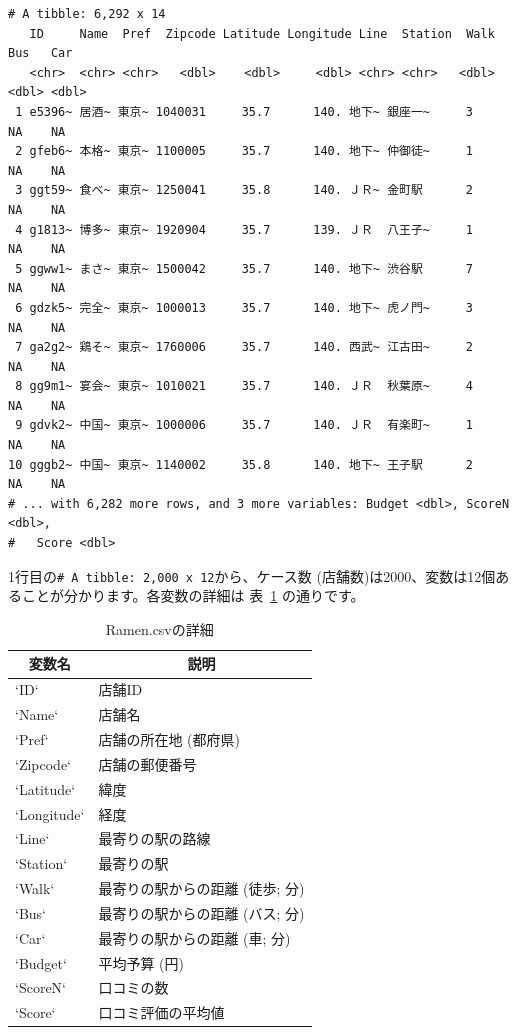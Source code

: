 \documentclass[
  a4paper,
  pandoc,
  ja=standard,
  jafont=haranoaji]{bxjsbook}
\begin{document}
\begin{verbatim}
# A tibble: 6,292 x 14
   ID     Name  Pref  Zipcode Latitude Longitude Line  Station  Walk   Bus   Car
   <chr>  <chr> <chr>   <dbl>    <dbl>     <dbl> <chr> <chr>   <dbl> <dbl> <dbl>
 1 e5396~ 居酒~ 東京~ 1040031     35.7      140. 地下~ 銀座一~     3    NA    NA
 2 gfeb6~ 本格~ 東京~ 1100005     35.7      140. 地下~ 仲御徒~     1    NA    NA
 3 ggt59~ 食べ~ 東京~ 1250041     35.8      140. ＪＲ~ 金町駅      2    NA    NA
 4 g1813~ 博多~ 東京~ 1920904     35.7      139. ＪＲ  八王子~     1    NA    NA
 5 ggww1~ まさ~ 東京~ 1500042     35.7      140. 地下~ 渋谷駅      7    NA    NA
 6 gdzk5~ 完全~ 東京~ 1000013     35.7      140. 地下~ 虎ノ門~     3    NA    NA
 7 ga2g2~ 鶏そ~ 東京~ 1760006     35.7      140. 西武~ 江古田~     2    NA    NA
 8 gg9m1~ 宴会~ 東京~ 1010021     35.7      140. ＪＲ  秋葉原~     4    NA    NA
 9 gdvk2~ 中国~ 東京~ 1000006     35.7      140. ＪＲ  有楽町~     1    NA    NA
10 gggb2~ 中国~ 東京~ 1140002     35.8      140. 地下~ 王子駅      2    NA    NA
# ... with 6,282 more rows, and 3 more variables: Budget <dbl>, ScoreN <dbl>,
#   Score <dbl>
\end{verbatim}

1行目の\texttt{\#\ A\ tibble:\ 2,000\ x\ 12}から、ケース数
(店舗数)は2000、変数は12個あることが分かります。各変数の詳細は
表~\ref{tbl-handling1_dataset} の通りです。

\hypertarget{tbl-handling1_dataset}{}
\begin{table}
\caption{\label{tbl-handling1_dataset}Ramen.csvの詳細 }

\centering
\begin{tabular}{l|l}
\hline
\multicolumn{1}{c}{変数名} & \multicolumn{1}{c}{説明}\\
\hline
`ID` & 店舗ID\\
\hline
`Name` & 店舗名\\
\hline
`Pref` & 店舗の所在地 (都府県)\\
\hline
`Zipcode` & 店舗の郵便番号\\
\hline
`Latitude` & 緯度\\
\hline
`Longitude` & 経度\\
\hline
`Line` & 最寄りの駅の路線\\
\hline
`Station` & 最寄りの駅\\
\hline
`Walk` & 最寄りの駅からの距離 (徒歩; 分)\\
\hline
`Bus` & 最寄りの駅からの距離 (バス; 分)\\
\hline
`Car` & 最寄りの駅からの距離 (車; 分)\\
\hline
`Budget` & 平均予算 (円)\\
\hline
`ScoreN` & 口コミの数\\
\hline
`Score` & 口コミ評価の平均値\\
\hline
\end{tabular}
\end{table}
\end{document}
